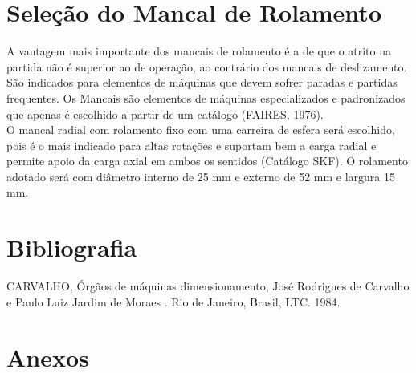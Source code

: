 \documentclass[a4paper, 11pt]{article}
\begin{document}
\section{Sele\c{c}\~ao do Mancal de Rolamento}
A vantagem mais importante dos mancais de rolamento \'e a de que o
atrito na partida não \'e superior ao de opera\c{c}\~ao, ao contr\'ario dos mancais de
deslizamento. São indicados para elementos de m\'aquinas que devem sofrer
paradas e partidas frequentes. Os Mancais s\~ao elementos de m\'aquinas
especializados e padronizados que apenas \'e escolhido a partir de um cat\'alogo
(FAIRES, 1976).\\
O mancal radial com rolamento fixo com uma carreira de esfera ser\'a
escolhido, pois \'e o mais indicado para altas rota\c{c}\~oes e suportam bem a carga
radial e permite apoio da carga axial em ambos os sentidos (Cat\'alogo SKF). O
rolamento adotado ser\'a com di\^ametro interno de 25 mm e externo de 52 mm e largura 15 mm.
\section*{Bibliografia}
\footnotesize{

\noindent CARVALHO, \'Org\~aos de m\'aquinas dimensionamento, Jos\'e Rodrigues de Carvalho e Paulo Luiz Jardim de Moraes . Rio de Janeiro, Brasil, LTC. 1984.\\

}
\newpage
{}
\section*{Anexos}
\end{document}

